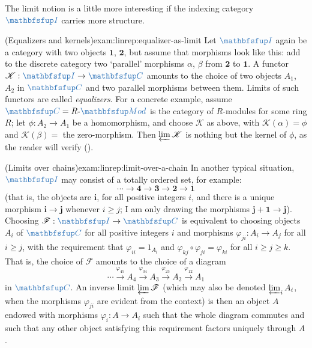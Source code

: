 The limit notion is a little more interesting if the indexing category
$\categ{I}$ carries more structure.
\begin{exam}{(Equalizers and kernels)}{exam:linrep:equalizer-as-limit}
  Let $\categ{I}$ again be a category with two objects $\mathbf{1}$,
  $\mathbf{2}$, but assume that morphisms look like this: add to the
  discrete category two `parallel' morphisms $\alpha$, $\beta$ from
  $\mathbf{2}$ to $\mathbf{1}$. A functor
  $\mathscr{K} : \categ{I} \to \categ{C}$ amounts to the choice of two
  objects $A_1$, $A_2$ in $\categ{C}$ and two parallel morphisms
  between them. Limits of such functors are called
  \emph{equalizers}. For a concrete example, assume
  $\categ{C} = R\text{-}\categ{Mod}$ is the category of $R$-modules
  for some ring $R$; let $\phi : A_2 \to A_1$ be a homomorphism, and
  choose $\mathscr{K}$ as above, with $\mathscr{K}(\alpha) = \phi$ and
  $\mathscr{K}(\beta) = $ the zero-morphism. Then
  $\varprojlim \mathscr{K}$ is nothing but the kernel of $\phi$, as
  the reader will verify
  ().
\end{exam}
\begin{exam}{(Limits over chains)}{exam:linrep:limit-over-a-chain}
  In another typical situation, $\categ{I}$ may consist of a totally
  ordered set, for example:
  \[
    \cdots \to \mathbf{4} \to \mathbf{3} \to \mathbf{2} \to \mathbf{1}
  \]
  (that is, the objects are $\mathbf{i}$, for all positive integers
  $i$, and there is a unique morphism $\mathbf{i} \to \mathbf{j}$
  whenever $i \geq j$; I am only drawing the morphisms
  $\mathbf{j+1} \to \mathbf{j}$). Choosing
  $\mathscr{F} : \categ{I} \to \categ{C}$ is equivalent to choosing
  objects $A_i$ of $\categ{C}$ for all positive integers $i$ and
  morphisms $\varphi_{ji} : A_i \to A_j$ for all $i \geq j$, with the
  requirement that $\varphi_{ii} = 1_{A_i}$ and
  $\varphi_{kj} \circ \varphi_{ji} = \varphi_{ki}$ for all
  $i \geq j \geq k$. That is, the choice of $\mathscr{F}$ amounts to
  the choice of a diagram
  \[
    \cdots \xrightarrow{\varphi_{45}} A_4 \xrightarrow{\varphi_{34}}
    A_3 \xrightarrow{\varphi_{23}} A_2 \xrightarrow{\varphi_{12}} A_1
  \]
  in $\categ{C}$. An inverse limit $\varprojlim \mathscr{F}$ (which
  may also be denoted $\varprojlim_i A_i$, when the morphisms
  $\varphi_{ji}$ are evident from the context) is then an object $A$
  endowed with morphisms $\varphi_i : A \to A_i$ such that the whole
  diagram commutes and such that any other object satisfying this
  requirement factors uniquely through $A$.
\end{exam}
